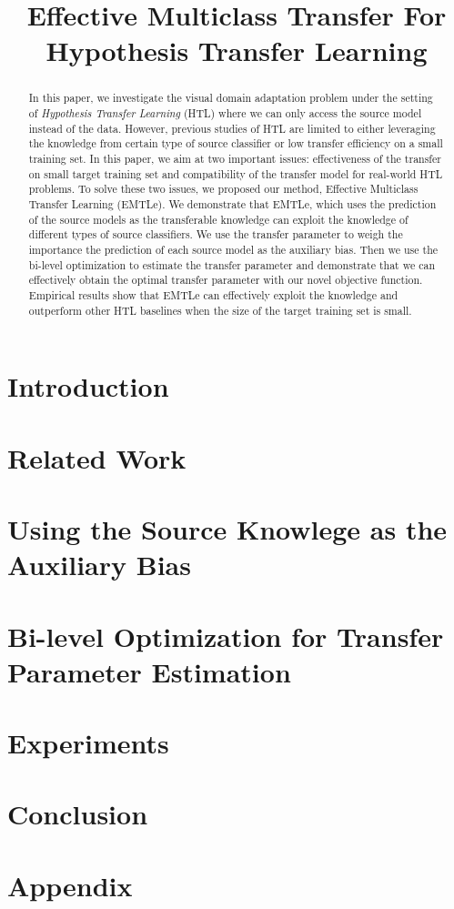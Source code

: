 \documentclass{llncs}
\begin{document}
\title{Effective Multiclass Transfer For Hypothesis Transfer Learning}
\maketitle
\begin{abstract}
	In this paper, we investigate the visual domain adaptation problem under the setting of \textit{Hypothesis Transfer Learning} (HTL) where we can only access the source model instead of the data. However, previous studies of HTL are limited to either leveraging the knowledge from certain type of source classifier or low transfer efficiency on a small training set. In this paper, we aim at two important issues: effectiveness of the transfer on small target training set and compatibility of the transfer model for real-world HTL problems. To solve these two issues, we proposed our method, Effective Multiclass Transfer Learning (EMTLe).
	We demonstrate that EMTLe, which uses the prediction of the source models as the transferable knowledge can exploit the knowledge of different types of source classifiers. We use the transfer parameter to weigh the importance the prediction of each source model as the auxiliary bias. Then we use the bi-level optimization to estimate the transfer parameter and demonstrate that we can effectively obtain the optimal transfer parameter with our novel objective function. Empirical results show that EMTLe can effectively exploit the knowledge and outperform other HTL baselines when the size of the target training set is small.  
\end{abstract}

\section{Introduction}


\section{Related Work}\label{sec:work}


\section{Using the Source Knowlege as the Auxiliary Bias}\label{sec:prob}


\section{Bi-level Optimization for Transfer Parameter Estimation}\label{sec:smitle}

%

\section{Experiments}\label{sec:exp}


\section{Conclusion}



\section*{Appendix}







\end{document}
